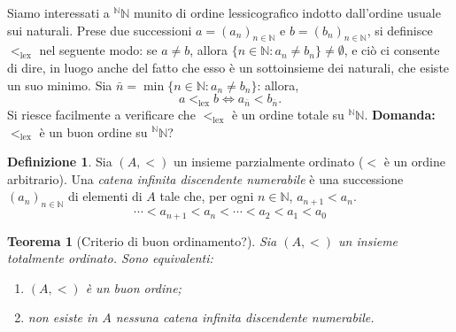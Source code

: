 \documentclass[fontsize = 11 pt, paper=A4, oneside, index=totoc, hyperref]{article}
\theoremstyle{definition}
\newtheorem{dfn}{Definizione}[section]
\theoremstyle{plain}
\newtheorem{thm}{Teorema}[section]
\newcommand{\N}{\mathbb{N}}
\begin{document}
Siamo interessati a \({}^\N\N\) munito di ordine lessicografico indotto dall'ordine usuale sui naturali. Prese due successioni \(a = (a_n)_{n \in \N}\) e \(b = (b_n)_{n \in \N}\), si definisce \(<_{\mathrm{lex}}\) nel seguente modo: se \(a \neq b\), allora \(\lbrace n \in \N \colon a_n \neq b_n\rbrace \neq \emptyset\), e ciò ci consente di dire, in luogo anche del fatto che esso è un sottoinsieme dei naturali, che esiste un suo minimo. Sia \(\bar{n} = \min \lbrace n \in \N \colon a_n \neq b_n \rbrace\): allora,
\[
a <_{\mathrm{lex}} b \iff a_{\bar{n}} < b_{\bar{n}}.
\]
Si riesce facilmente a verificare che \(<_{\mathrm{lex}}\) è un ordine totale su \({}^\N\N\). {\bf Domanda:} \(<_{\mathrm{lex}}\) è un buon ordine su \({}^\N\N\)?
\begin{dfn}
  Sia \((A, <)\) un insieme parzialmente ordinato (\(<\) è un ordine arbitrario). Una \emph{catena infinita discendente numerabile} è una successione \((a_n)_{n \in \N}\) di elementi di \(A\) tale che, per ogni \(n \in \N\), \(a_{n+1} < a_n\).
  \[
  \dotsb < a_{n+1} < a_n < \dotsb < a_2 < a_1 < a_0
  \]
\end{dfn}
\begin{thm}[Criterio di buon ordinamento?]
  Sia \((A, <)\) un insieme totalmente ordinato. Sono equivalenti:
  \begin{enumerate}
    \item \((A,<)\) è un buon ordine;
    \item non esiste in \(A\) nessuna catena infinita discendente numerabile.
  \end{enumerate}
\end{thm}
\end{document}
